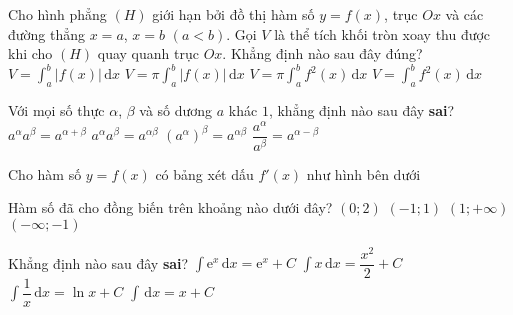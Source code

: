 \begin{ex}%
	Cho hình phẳng $(H)$ giới hạn bởi đồ thị hàm số $y=f(x)$, trục $Ox$ và các đường thẳng $x=a$, $x=b$ $(a<b)$. Gọi $V$ là thể tích khối tròn xoay thu được khi cho $(H)$ quay quanh trục $Ox$. Khẳng định nào sau đây đúng?	
	\choice
	{$V=\displaystyle\int^b_a\left|f(x)\right|\mathrm{\,d}x$}
	{$V=\pi \displaystyle\int^b_a\left|f(x)\right|\mathrm{\,d}x$}
	{\True $V=\pi\displaystyle\int^b_af^2(x)\mathrm{\,d}x$}
	{$V=\displaystyle\int^b_af^2(x)\mathrm{\,d}x$}
\end{ex}

\begin{ex}%
	Với mọi số thực $\alpha$, $\beta$ và số dương $a$ khác $1$, khẳng định nào sau đây \textbf{sai}?	
	\choice
	{$a^{\alpha}a^{\beta}=a^{\alpha+\beta}$}
	{\True $a^{\alpha}a^{\beta}=a^{\alpha\beta}$}
	{$\left(a^{\alpha}\right)^{\beta}=a^{\alpha\beta}$}
	{$\dfrac{a^{\alpha}}{a^{\beta}}=a^{\alpha-\beta}$}
\end{ex}

\begin{ex}%
	Cho hàm số $y=f(x)$ có bảng xét dấu $f'(x)$ như hình bên dưới
	\begin{center}
	\end{center}
	Hàm số đã cho đồng biến trên khoảng nào dưới đây?
	\choice
	{$(0;2)$}
	{\True$(-1;1)$}
	{$(1;+\infty)$}
	{$(-\infty;-1)$}
\end{ex}

\begin{ex}%
	Khẳng định nào sau đây \textbf{sai}?	
	\choice
	{$\displaystyle\int \mathrm{e}^x\mathrm{\,d}x=\mathrm{e}^x+C$}
	{$\displaystyle\int x\mathrm{\,d}x=\dfrac{x^2}{2}+C$}
	{\True $\displaystyle\int \dfrac{1}{x}\mathrm{\,d}x=\ln x+C$}
	{$\displaystyle\int \mathrm{\,d}x=x+C$}
\end{ex}

